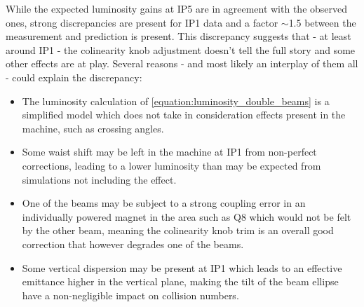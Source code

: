 While the expected luminosity gains at IP\num{5} are in agreement with the observed ones, strong discrepancies are present for IP\num{1} data and a factor \(\sim\)\num{1.5} between the measurement and prediction is present.
This discrepancy suggests that - at least around IP\num{1} - the colinearity knob adjustment doesn't tell the full story and some other effects are at play.
Several reasons - and most likely an interplay of them all - could explain the discrepancy:
\begin{itemize}
    \item The luminosity calculation of \cref{equation:luminosity_double_beams} is a simplified model which does not take in consideration effects present in the machine, such as crossing angles.
    \item Some waist shift may be left in the machine at IP\num{1} from non-perfect corrections, leading to a lower luminosity than may be expected from simulations not including the effect.
    \item One of the beams may be subject to a strong coupling error in an individually powered magnet in the area such as Q\num{8} which would not be felt by the other beam, meaning the colinearity knob trim is an overall good correction that however degrades one of the beams.
    \item Some vertical dispersion may be present at IP\num{1} which leads to an effective emittance higher in the vertical plane, making the tilt of the beam ellipse have a non-negligible impact on collision numbers.
\end{itemize}




